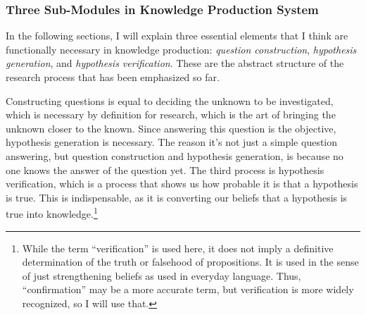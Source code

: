 
\subsubsection{Three Sub-Modules in Knowledge Production System}
In the following sections, I will explain three essential elements that I think are functionally necessary in knowledge production: \textit{question construction}, \textit{hypothesis generation}, and \textit{hypothesis verification}. These are the abstract structure of the research process that has been emphasized so far.

Constructing questions is equal to deciding the unknown to be investigated, which is necessary by definition for research, which is the art of bringing the unknown closer to the known. Since answering this question is the objective, hypothesis generation is necessary. The reason it's not just a simple question answering, but question construction and hypothesis generation, is because no one knows the answer of the question yet. The third process is hypothesis verification, which is a process that shows us how probable it is that a hypothesis is true. This is indispensable, as it is converting our beliefs that a hypothesis is true into knowledge.\footnote{
While the term ``verification'' is used here, it does not imply a definitive determination of the truth or falsehood of propositions. It is used in the sense of just strengthening beliefs as used in everyday language. Thus, ``confirmation'' may be a more accurate term, but verification is more widely recognized, so I will use that.
}



